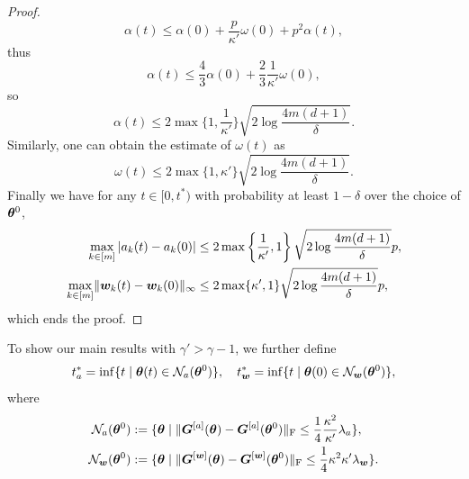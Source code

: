 \documentclass{article}
\begin{document}
\begin{proof}
\begin{equation}
        \alpha(t)\leq\alpha(0)+\frac{p}{\kappa'}\omega(0)+p^2\alpha(t),
    \end{equation}
    thus
    \begin{equation}
        \alpha(t)\leq\frac{4}{3}\alpha(0)+\frac{2}{3}\frac{1}{\kappa'}\omega(0),
    \end{equation}
    so
    \begin{equation}
        \alpha(t)\leq 2\max\{1,\frac{1}{\kappa'}\}\sqrt{2\log\frac{4m(d+1)}{\delta}}.
    \end{equation}
    Similarly, one can obtain the estimate of $\omega(t)$ as
    \begin{equation}
        \omega(t)\leq 2\max\{1,\kappa'\}\sqrt{2\log\frac{4m(d+1)}{\delta}}.
    \end{equation}
    Finally we have for any $t\in[0, t^*)$ with probability at least $1-\delta$ over the choice of $\bm{\theta}^0$,
    \begin{equation}
        \begin{aligned}
            \max\limits_{k\in[m]}|a_k(t) - a_k(0)|
             & \leq 2\max\left\{\frac{1}{\kappa'},1\right\}\sqrt{2\log\frac{4m(d+1)}{\delta}}p, \\
            \max\limits_{k\in[m]}\lVert\bm{w}_k(t) - \bm{w}_k(0)\rVert_{\infty}
             & \leq 2\max\{
            \kappa',1\}\sqrt{2\log\frac{4m(d+1)}{\delta}}p,
        \end{aligned}
    \end{equation}
    which ends the proof.
\end{proof}

To show our main results with $\gamma'>\gamma-1$, we further define
\begin{equation}
    t^*_a=\inf\{t\mid \bm{\theta}(t)\in\mathcal{N}_a(\bm{\theta}^0)\}, \quad t^*_{\bm{w}}=\inf\{t\mid \bm{\theta}(0)\in\mathcal{N}_{\bm{w}}(\bm{\theta}^0)\},
\end{equation}
where
\begin{equation}
    \begin{aligned}
        \mathcal{N}_a(\bm{\theta}^0)     & :=\{\bm{\theta}\mid\lVert\bm{G}^{[a]}(\bm{\theta})-\bm{G}^{[a]}(\bm{\theta}^0)\rVert_\mathrm{F}\leq\frac{1}{4}\frac{\kappa^2}{\kappa'}\lambda_a\}, \\
        \mathcal{N}_{\bm{w}}(\bm{\theta}^0) & :=\{\bm{\theta}\mid\lVert\bm{G}^{[\bm{w}]}(\bm{\theta})-\bm{G}^{[\bm{w}]}(\bm{\theta}^0)\rVert_\mathrm{F}\leq\frac{1}{4}\kappa^2\kappa'\lambda_{\bm{w}}\}.
    \end{aligned}
\end{equation}
\end{document}
